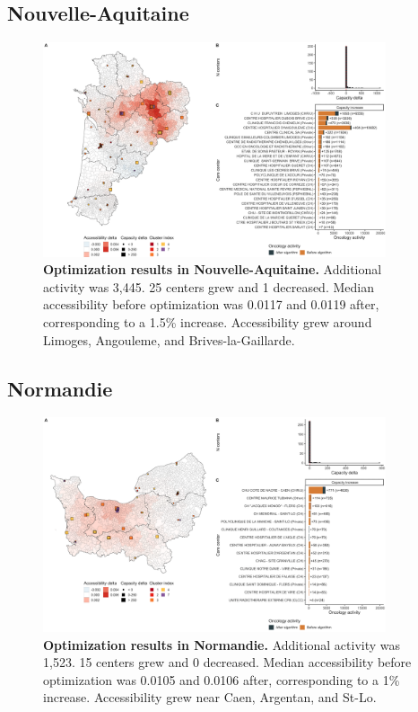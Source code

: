 \subsection*{Nouvelle-Aquitaine}

\begin{figure}[H]
    \includegraphics[width=0.9\textwidth]{images/camion/optim_region/optim_Nouvelle-Aquitaine.png}
    \centering
    \caption{ \textbf{Optimization results in Nouvelle-Aquitaine.} Additional
        activity was 3,445. 25 centers grew and 1 decreased. Median
        accessibility before optimization was 0.0117 and 0.0119 after,
        corresponding to a 1.5\% increase. Accessibility grew around Limoges,
        Angouleme, and Brives-la-Gaillarde. }
\end{figure}

\subsection*{Normandie}

\begin{figure}[H]
    \includegraphics[width=0.9\textwidth]{images/camion/optim_region/optim_Normandie.png}
    \centering
    \caption{ \textbf{Optimization results in Normandie.} Additional activity
        was 1,523. 15 centers grew and 0 decreased. Median accessibility before
        optimization was 0.0105 and 0.0106 after, corresponding to a 1\%
        increase. Accessibility grew near Caen, Argentan, and St-Lo. }
\end{figure}

